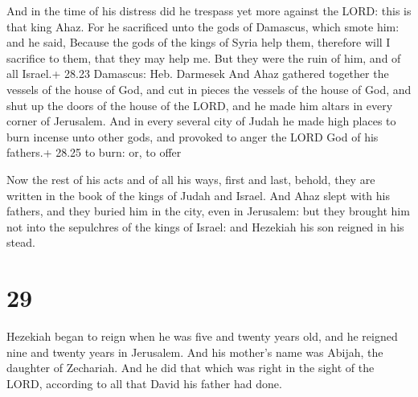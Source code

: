  And in the time of his distress did he trespass yet more
against the LORD: this is that king Ahaz.  For he
sacrificed unto the gods of Damascus, which smote him: and he said,
Because the gods of the kings of Syria help them, therefore will I
sacrifice to them, that they may help me. But they were the ruin of him,
and of all Israel.+ 28.23 Damascus: Heb. Darmesek  And Ahaz
gathered together the vessels of the house of God, and cut in pieces the
vessels of the house of God, and shut up the doors of the house of the
LORD, and he made him altars in every corner of Jerusalem. 
And in every several city of Judah he made high places to burn incense
unto other gods, and provoked to anger the LORD God of his fathers.+
28.25 to burn: or, to offer

 Now the rest of his acts and of all his ways, first and
last, behold, they are written in the book of the kings of Judah and
Israel.  And Ahaz slept with his fathers, and they buried
him in the city, even in Jerusalem: but they brought him not into the
sepulchres of the kings of Israel: and Hezekiah his son reigned in his
stead.

\hypertarget{section-28}{%
\section{29}\label{section-28}}

 Hezekiah began to reign when he was five and twenty years
old, and he reigned nine and twenty years in Jerusalem. And his mother's
name was Abijah, the daughter of Zechariah.  And he did that
which was right in the sight of the LORD, according to all that David
his father had done.

